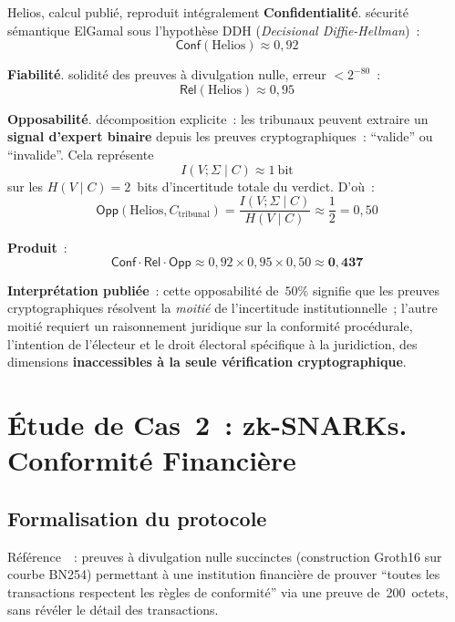 \begin{boxoutils}{Helios, calcul publié, reproduit intégralement}
\textbf{Confidentialité}. sécurité sémantique ElGamal sous
l'hypothèse DDH (\textit{Decisional Diffie-Hellman})~:
\[
\mathsf{Conf}(\text{Helios}) \approx 0{,}92
\]

\textbf{Fiabilité}. solidité des preuves à divulgation nulle,
erreur $< 2^{-80}$~:
\[
\mathsf{Rel}(\text{Helios}) \approx 0{,}95
\]

\textbf{Opposabilité}. décomposition explicite~:
les tribunaux peuvent extraire un \textbf{signal d'expert binaire}
depuis les preuves cryptographiques~: ``valide'' ou ``invalide''.
Cela représente
\[
I(V;\Sigma\mid C) \approx 1~\text{bit}
\]
sur les $H(V\mid C) = 2$~bits d'incertitude totale du verdict. D'où~:
\[
\mathsf{Opp}(\text{Helios}, C_{\text{tribunal}}) =
\frac{I(V;\Sigma\mid C)}{H(V\mid C)} \approx \frac{1}{2} = 0{,}50
\]

\textbf{Produit}~:
\[
\mathsf{Conf}\cdot\mathsf{Rel}\cdot\mathsf{Opp} \approx
0{,}92 \times 0{,}95 \times 0{,}50 \approx \mathbf{0{,}437}
\]
\end{boxoutils}

\textbf{Interprétation publiée}~: cette opposabilité de~$50\%$
signifie que les preuves cryptographiques résolvent la \emph{moitié}
de l'incertitude institutionnelle~; l'autre moitié requiert un
raisonnement juridique sur la conformité procédurale, l'intention
de l'électeur et le droit électoral spécifique à la
juridiction, des dimensions \textbf{inaccessibles à la seule
vérification cryptographique}.

\section{Étude de Cas~2~: zk-SNARKs. Conformité Financière}
\label{sec:cas-zksnark}

\subsection{Formalisation du protocole}

Référence~\cite{groth2016zksnark}~: preuves à divulgation nulle
succinctes (construction Groth16 sur courbe BN254) permettant à une
institution financière de prouver ``toutes les transactions
respectent les règles de conformité'' via une preuve de~200~octets,
sans révéler le détail des transactions.


